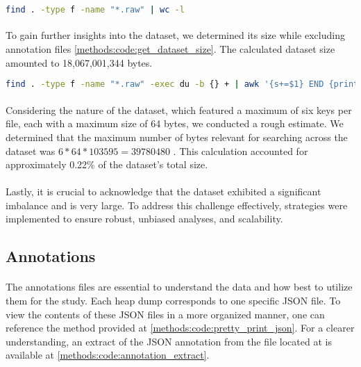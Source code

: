             \begin{lstlisting}[caption={Count heap dump raw dataset files}, label=methods:code:count_raw_files, language=bash]
            find . -type f -name "*.raw" | wc -l
            \end{lstlisting}

            \paragraph*{}To gain further insights into the dataset, we determined its size while excluding annotation files \ref{methods:code:get_dataset_size}. The calculated dataset size amounted to 18,067,001,344 bytes.

            \begin{lstlisting}[caption={Get the size of the dataset}, label=methods:code:get_dataset_size, language=bash]
            find . -type f -name "*.raw" -exec du -b {} + | awk '{s+=$1} END {print s}'
            \end{lstlisting}

            \paragraph{}Considering the nature of the dataset, which featured a maximum of six keys per file, each with a maximum size of 64 bytes, we conducted a rough estimate. We determined that the maximum number of bytes relevant for searching across the dataset was $6 * 64 * 103595 = 39 780 480$ . This calculation accounted for approximately 0.22\% of the dataset's total size.

            \paragraph{}Lastly, it is crucial to acknowledge that the dataset exhibited a significant imbalance and is very large. To address this challenge effectively, strategies were implemented to ensure robust, unbiased analyses, and scalability.
        \subsection*{Annotations}
            \paragraph{}The annotations files are essential to understand the data and how best to utilize them for the study. Each heap dump corresponds to one specific JSON file. To view the contents of these JSON files in a more organized manner, one can reference the method provided at \ref{methods:code:pretty_print_json}. For a clearer understanding, an extract of the JSON annotation from the file located at  is available at \ref{methods:code:annotation_extract}.

